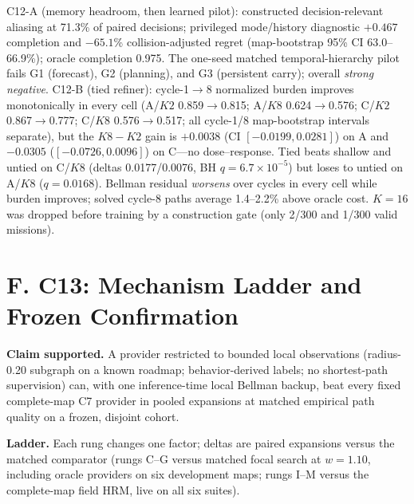 \documentclass[letterpaper]{article} %
\newcommand{\stage}[1]{\textsc{#1}}
\begin{document}
\stage{C12-A} (memory headroom, then learned pilot): constructed decision-relevant aliasing at 71.3\% of paired decisions; privileged mode/history diagnostic $+0.467$ completion and $-65.1$\% collision-adjusted regret (map-bootstrap 95\% CI 63.0--66.9\%); oracle completion 0.975. The one-seed matched temporal-hierarchy pilot fails G1 (forecast), G2 (planning), and G3 (persistent carry); overall \emph{strong negative}. \stage{C12-B} (tied refiner): cycle-1$\to$8 normalized burden improves monotonically in every cell (A/$K2$ 0.859$\to$0.815; A/$K8$ 0.624$\to$0.576; C/$K2$ 0.867$\to$0.777; C/$K8$ 0.576$\to$0.517; all cycle-1/8 map-bootstrap intervals separate), but the $K8{-}K2$ gain is $+0.0038$ (CI $[-0.0199, 0.0281]$) on A and $-0.0305$ ($[-0.0726, 0.0096]$) on C---no dose--response. Tied beats shallow and untied on C/$K8$ (deltas 0.0177/0.0076, BH $q{=}6.7{\times}10^{-5}$) but loses to untied on A/$K8$ ($q{=}0.0168$). Bellman residual \emph{worsens} over cycles in every cell while burden improves; solved cycle-8 paths average 1.4--2.2\% above oracle cost. $K{=}16$ was dropped before training by a construction gate (only 2/300 and 1/300 valid missions).

\section{F. C13: Mechanism Ladder and Frozen Confirmation}

\textbf{Claim supported.} A provider restricted to bounded local observations (radius-0.20 subgraph on a known roadmap; behavior-derived labels; no shortest-path supervision) can, with one inference-time local Bellman backup, beat every fixed complete-map \stage{C7} provider in pooled expansions at matched empirical path quality on a frozen, disjoint cohort.

\textbf{Ladder.} Each rung changes one factor; deltas are paired expansions versus the matched comparator (rungs C--G versus matched focal search at $w{=}1.10$, including oracle providers on six development maps; rungs I--M versus the complete-map field HRM, live on all six suites).
\end{document}
